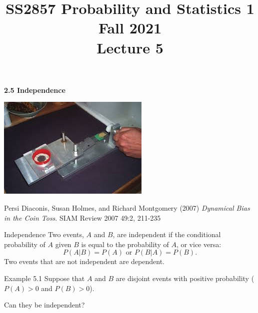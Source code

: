 \documentclass[aspectratio=169,xcolor=pdftex,dvipsnames,table]{beamer}\usepackage[]{graphicx}\usepackage[]{xcolor}
\title[SS2857 -- Lecture 5]{SS2857 Probability and Statistics 1\\
  Fall 2021\\
  \vspace{.2in}
  Lecture 5}
\date{}
\begin{document}
{

\begin{frame}
  \maketitle
\end{frame}
}


\begin{frame}
  \begin{center}
    \Large{\textbf{2.5 Independence}}

    \includegraphics[height = .6\textheight]{Figures/coin_tossing_machine.jpg}
    

  \end{center}
  
    \begin{small}
    Persi Diaconis, Susan Holmes, and Richard Montgomery (2007) \textit{Dynamical Bias in the Coin Toss}. SIAM Review 2007 49:2, 211-235
    \end{small}
\end{frame}

\begin{frame}{Independence}
  Two events, $A$ and $B$, are independent if the conditional probability of $A$ given $B$ is equal to the probability of $A$, or vice versa:
  \[
    P(A|B)=P(A) \mbox{ or } P(B|A)=P(B).
  \]
  Two events that are not independent are dependent.
\end{frame}

\begin{frame}{Example 5.1}
  Suppose that $A$ and $B$ are disjoint events with positive probability ($P(A)>0$ and $P(B)>0$).

  \begin{center}
    Can they be independent?
  \end{center}
\end{frame}
\end{document}
